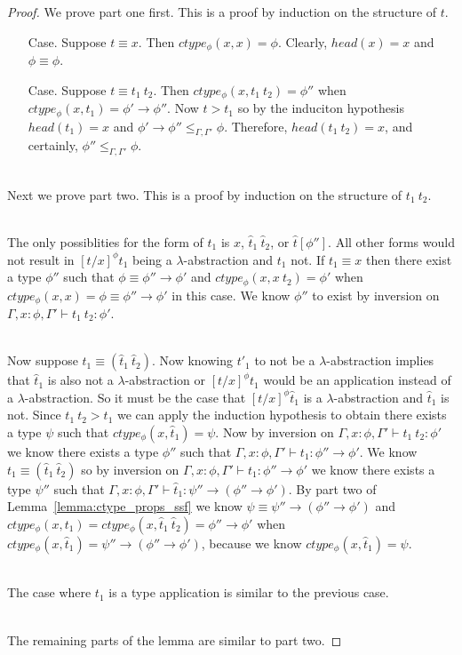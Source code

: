 \begin{proof}
  We prove part one first. This is a proof by induction on the structure of $t$.

\begin{itemize}
\item[Case.] Suppose $t \equiv x$.  Then $ctype_\phi(x,x) = \phi$.  Clearly,
  $head(x) = x$ and $\phi \equiv \phi$.
  
\item[Case.] Suppose $t \equiv t_1\ t_2$.  Then $ctype_\phi(x,t_1\ t_2) = \phi''$
  when $ctype_\phi(x,t_1) = \phi' \to \phi''$.  Now $t > t_1$ so by the induciton
  hypothesis $head(t_1) = x$ and $\phi' \to \phi'' \leq_{\Gamma,\Gamma'} \phi$.
  Therefore, $head(t_1\ t_2) = x$, and certainly, $\phi'' \leq_{\Gamma,\Gamma'} \phi$.
\end{itemize}

\ \\
Next we prove part two.  This is a proof by induction on the structure of $t_1\ t_2$.

\ \\
The only possiblities for the form of $t_1$ is $x$, $\hat{t}_1\ \hat{t}_2$, or $\hat{t}[\phi'']$.  All other 
forms would not result in $[t/x]^\phi t_1$ being a $\lambda$-abstraction and $t_1$ not.
If $t_1 \equiv x$ then there exist a type $\phi''$ such that $\phi \equiv \phi'' \to \phi'$ and
$ctype_\phi(x,x\ t_2) = \phi'$ when $ctype_\phi(x,x) = \phi \equiv \phi'' \to \phi'$ in this case.  We know
$\phi''$ to exist by inversion on $\Gamma,x:\phi,\Gamma' \vdash t_1\ t_2:\phi'$.

\ \\
Now suppose $t_1 \equiv (\hat{t}_1\ \hat{t}_2)$.  Now knowing $t'_1$ to not be a $\lambda$-abstraction
implies that $\hat{t}_1$ is also not a $\lambda$-abstraction or $[t/x]^\phi t_1$ would be an application
instead of a $\lambda$-abstraction.  So it must be the case that $[t/x]^\phi \hat{t}_1$ is a $\lambda$-abstraction
and $\hat{t}_1$ is not.  Since $t_1\ t_2 > t_1$ we can apply the induction hypothesis to obtain there exists
a type $\psi$ such that $ctype_\phi(x,\hat{t}_1) = \psi$.  
Now by inversion on $\Gamma,x:\phi,\Gamma' \vdash t_1\ t_2:\phi'$ we know there exists a type $\phi''$ such that
$\Gamma,x:\phi,\Gamma' \vdash t_1:\phi'' \to \phi'$.  We know $t_1 \equiv (\hat{t}_1\ \hat{t}_2)$ so by inversion on
$\Gamma,x:\phi,\Gamma' \vdash t_1:\phi'' \to \phi'$ we know there exists a type $\psi''$ such that
$\Gamma,x:\phi,\Gamma' \vdash \hat{t}_1:\psi'' \to (\phi'' \to \phi')$.
By part two of Lemma~\ref{lemma:ctype_props_ssf} we know $\psi \equiv \psi'' \to (\phi'' \to \phi')$ and
$ctype_\phi(x,t_1) = ctype_\phi(x,\hat{t}_1\ \hat{t}_2) = \phi'' \to \phi'$ 
when $ctype_\phi(x,\hat{t}_1) = \psi'' \to (\phi'' \to \phi')$, because we know $ctype_\phi(x,\hat{t}_1) = \psi$.

\ \\
The case where $t_1$ is a type application is similar to the previous case.

\ \\
The remaining parts of the lemma are similar to part two.
\end{proof}

